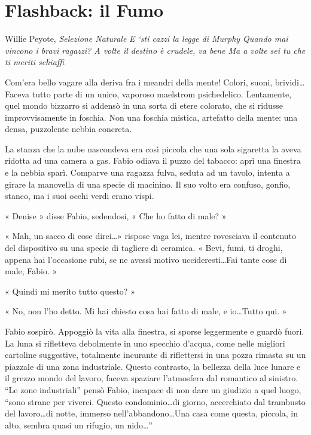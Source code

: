 \chapter{Flashback: il Fumo}

\begin{chapquote}{Willie Peyote, \textit{Selezione Naturale}}
	\textit{E `sti cazzi la legge di Murphy\newline
		Quando mai vincono i bravi ragazzi?\newline
		A volte il destino è crudele, va bene\newline
		Ma a volte sei tu che ti meriti schiaffi
	}
\end{chapquote}


Com'era bello vagare alla deriva fra i meandri della mente! Colori, suoni, brividi\ldots Faceva tutto parte di un unico, vaporoso maelstrom psichedelico. Lentamente, quel mondo bizzarro si addensò in una sorta di etere colorato, che si ridusse improvvisamente in foschia. Non una foschia mistica, artefatto della mente: una densa, puzzolente nebbia concreta.

La stanza che la nube nascondeva era così piccola che una sola sigaretta la aveva ridotta ad una camera a gas. Fabio odiava il puzzo del tabacco: aprì una finestra e la nebbia sparì. Comparve una ragazza fulva, seduta ad un tavolo, intenta a girare la manovella di una specie di macinino. Il suo volto era confuso, gonfio, stanco, ma i suoi occhi verdi erano vispi.

« Denise » disse Fabio, sedendosi, « Che ho fatto di male? »

« Mah, un sacco di cose direi\ldots » rispose vaga lei, mentre rovesciava il contenuto del dispositivo su una specie di tagliere di ceramica. « Bevi, fumi, ti droghi, appena hai l'occasione rubi, se ne avessi motivo uccideresti\ldots Fai tante cose di male, Fabio. »

« Quindi mi merito tutto questo? »

« No, non l'ho detto. Mi hai chiesto cosa hai fatto di male, e io\ldots Tutto qui. »

Fabio sospirò. Appoggiò la vita alla finestra, si sporse leggermente e guardò fuori. La luna si rifletteva debolmente in uno specchio d'acqua, come nelle migliori cartoline suggestive, totalmente incurante di riflettersi in una pozza rimasta su un piazzale di una zona industriale. Questo contrasto, la bellezza della luce lunare e il grezzo mondo del lavoro, faceva spaziare l'atmosfera dal romantico al sinistro. ``Le zone industriali'' pensò Fabio, incapace di non dare un giudizio a quel luogo, ``sono strane per viverci. Questo condominio\ldots di giorno, accerchiato dal trambusto del lavoro\ldots di notte, immerso nell'abbandono\ldots Una casa come questa, piccola, in alto, sembra quasi un rifugio, un nido\ldots''

